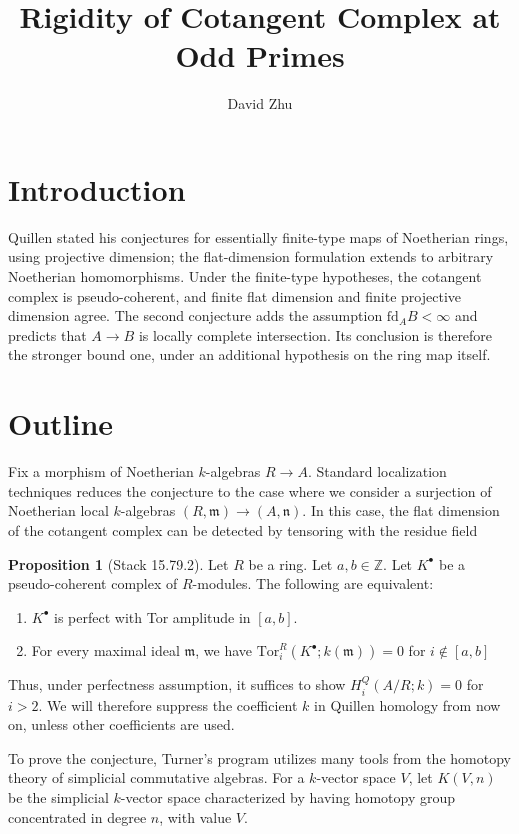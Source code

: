 \documentclass{article}
\title{Rigidity of Cotangent Complex at Odd Primes}
\author{David Zhu}
\newcommand{\Z}{\mathbb{Z}}
\newcommand{\Tor}{\textrm{Tor}}
\theoremstyle{definition}
\theoremstyle{definition}
\theoremstyle{definition}
\theoremstyle{definition}
\newtheorem{proposition}{Proposition}[theorem]
\theoremstyle{definition}
\theoremstyle{definition}
\theoremstyle{definition}
\theoremstyle{definition}
\begin{document}
\maketitle


\tableofcontents

\newpage


\section{Introduction}
Quillen stated his conjectures for essentially finite-type maps of
Noetherian rings, using projective dimension; the flat-dimension formulation
extends to arbitrary Noetherian homomorphisms. Under the finite-type
hypotheses, the cotangent complex is pseudo-coherent, and finite flat
dimension and finite projective dimension agree. The second conjecture
adds the assumption $\textrm{fd}_A B<\infty$ and predicts that $A\to B$ is locally
complete intersection. Its conclusion is therefore the stronger bound
one, under an additional hypothesis on the ring map itself. 


\section{Outline}
Fix a morphism of Noetherian $k$-algebras $R\to A$. Standard localization techniques reduces the conjecture to the case where we consider a surjection of Noetherian local $k$-algebras $(R,\mathfrak{m})\to (A, \mathfrak{n})$. In this case, the flat dimension of the cotangent complex can be detected by tensoring with the residue field
\begin{proposition}[Stack 15.79.2]
    Let $R$ be a ring. Let $a,b\in \Z$. Let $K^{\bullet}$ be a pseudo-coherent complex of $R$-modules. The following are equivalent: 
    \begin{enumerate}
        \item $K^{\bullet}$ is perfect with Tor amplitude in $[a,b]$.
        \item For every maximal ideal $\mathfrak{m}$, we have $\Tor^R_i(K^{\bullet};k(\mathfrak{m}))=0$ for $i\not \in [a,b]$
    \end{enumerate}
\end{proposition}
Thus, under perfectness assumption, it suffices to show $H_i^Q(A/R;k)=0$ for $i>2$. We will therefore suppress the coefficient $k$ in Quillen homology from now on, unless other coefficients are used.


To prove the conjecture, Turner's program utilizes many tools from the homotopy theory of simplicial commutative algebras. For a $k$-vector space $V$, let $K(V,n)$ be the simplicial $k$-vector space characterized by having homotopy group concentrated in degree $n$, with value $V$. 
\end{document}
